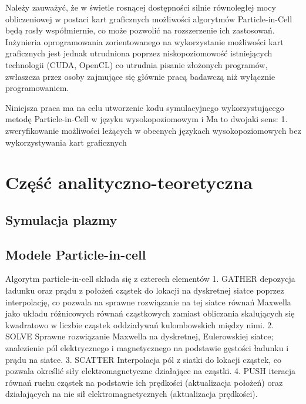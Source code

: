 Należy zauważyć, że w świetle rosnącej dostępności silnie równoległej mocy obliczeniowej w postaci kart graficznych %
możliwości algorytmów Particle-in-Cell będą rosły współmiernie, co może pozwolić na rozszerzenie ich zastosowań.
Inżynieria oprogramowania zorientowanego na wykorzystanie możliwości kart graficznych jest jednak utrudniona poprzez
niskopoziomowość %
istniejących technologii (CUDA, OpenCL) %
co utrudnia pisanie złożonych programów, zwłaszcza przez osoby zajmujące się głównie pracą badawczą
niż wyłącznie programowaniem. %

Niniejsza praca ma na celu utworzenie kodu symulacyjnego wykorzystującego metodę Particle-in-Cell w języku
wysokopoziomowym i %
Ma to dwojaki sens:
1. zweryfikowanie możliwości leżących w obecnych językach wysokopoziomowych bez wykorzystywania kart graficznych

\section{Część analityczno-teoretyczna} %

\subsection{Symulacja plazmy}

\subsection{Modele Particle-in-cell}

Algorytm particle-in-cell składa się z czterech elementów %
1. GATHER
depozycja ładunku oraz prądu z położeń cząstek do lokacji na dyskretnej siatce poprzez interpolację,
co pozwala na sprawne rozwiązanie na tej siatce
równań Maxwella jako układu różnicowych równań cząstkowych zamiast obliczania skalujących się kwadratowo w liczbie cząstek
oddziaływań kulombowskich między nimi.
2. SOLVE
Sprawne rozwiązanie Maxwella na dyskretnej, Eulerowskiej siatce; znalezienie pól elektrycznego i magnetycznego
na podstawie gęstości ładunku i prądu na siatce. 
3. SCATTER
Interpolacja pól z siatki do lokacji cząstek, co pozwala określić siły elektromagnetyczne działające na cząstki.
4. PUSH
iteracja równań ruchu cząstek na podstawie ich prędkości (aktualizacja położeń)
oraz działających na nie sił elektromagnetycznych (aktualizacja prędkości).

